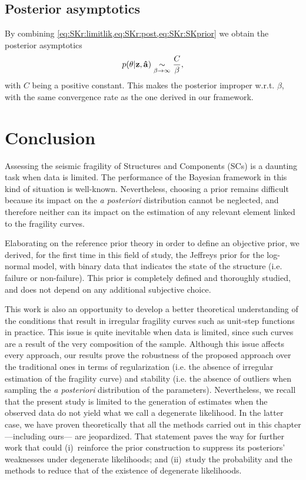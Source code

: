     \subsection{Posterior asymptotics}
\label{subapp:C3}
    By combining \cref{eq:SKr:limitlik,eq:SKr:post,eq:SKr:SKprior} we obtain the posterior asymptotics
    \begin{equation}
            p(\theta|\mathbf{z}, \mathbf{\hat a}) \underset{\beta\rightarrow{\infty}}{\sim} \frac{C}{\beta},
        \end{equation}
 with $C$ being a positive constant.
    This makes the posterior improper w.r.t. $\beta$, with the same convergence rate as the one derived in our framework.
        
    


\section{Conclusion}





Assessing the seismic fragility of Structures and Components (SCs) is a daunting task when data is limited. The performance of the Bayesian framework in this kind of situation is well-known. Nevertheless, choosing a prior remains difficult because its impact on the \emph{a posteriori} distribution cannot be neglected, and therefore neither can its impact on the estimation of any relevant element linked to the fragility curves. 

Elaborating on the reference prior theory in order to define an objective prior, we derived, for the first time in this field of study, the Jeffreys prior for the log-normal model, with binary data that indicates the state of the structure (i.e. failure or non-failure). This prior is completely defined and thoroughly studied, and does not depend on any additional subjective choice.

This work is also an opportunity to develop a better theoretical understanding of the conditions that result in irregular fragility curves such as  unit-step functions in practice. This issue is quite inevitable when data is limited, since such curves are a result of the very composition of the sample. Although this issue affects every approach, 
our results prove the robustness of the proposed approach over the traditional ones in terms of regularization (i.e. the absence of irregular estimation of the fragility curve) and stability (i.e. the absence of outliers when sampling the \emph{a posteriori} distribution of the parameters).  %
Nevertheless, we recall that the present study is limited to the generation of estimates when the observed data do not yield what we call a degenerate likelihood. In the latter case, we have proven theoretically that all the methods carried out in this chapter ---including ours--- are jeopardized.
That statement paves the way for further work that could (i)~reinforce the prior construction to suppress its posteriors' weaknesses under degenerate likelihoods; and (ii)~study the probability and the methods to reduce that of the existence of degenerate likelihoods. %

